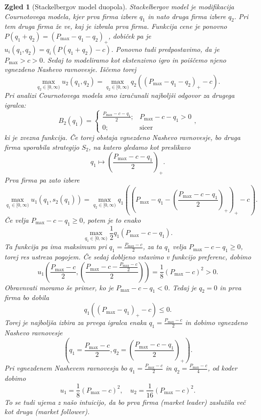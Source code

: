 \documentclass[10pt, a4paper]{article}
\newtheorem{zgled}[izr]{Zgled}
\begin{document}
\begin{zgled}[Stackelbergov model duopola]
  Stackelbergov model je modifikacija Cournotovega modela,
  kjer prva firma izbere $q_1$ in nato druga firma izbere $q_2$.
  Pri tem druga firma že ve, kaj je izbrala prva firma.
  Funkcija cene je ponovno $P(q_1 + q_2) = (P_{\max} -q_1 -q_2)_+$,
  dobiček pa je $u_i (q_1, q_2) = q_i(P(q_1 + q_2) - c)$.
  Ponovno tudi predpostavimo, da je $P_{\max} > c >0$.
  Sedaj to modeliramo kot ekstenzivno igro in poiščemo njeno vgnezdeno Nashevo ravnovesje.
  Iščemo torej 
  $$\max_{q_2 \in [0, \infty)} u_2 (q_1, q_2) = \max_{q_2 \in [0, \infty)} q_2 ((P_{\max} - q_1 - q_2)_+ - c).$$
  Pri analizi Cournotovega modela smo izračunali najboljši odgovor za drugega igralca:
  $$B_2 (q_1) = \begin{cases}
    \frac{P_{\max} - c - q_1}{2};& P_{\max} - c- q_1 > 0\\
    0;& \textrm{sicer}
  \end{cases},$$
  ki je zvezna funkcija. Če torej obstaja vgnezdeno Nashevo ravnovesje, bo druga firma uporabila strategijo $S_2$, 
  na katero gledamo kot preslikavo 
  $$q_1 \mapsto \left(\frac{P_{\max} - c - q_1}{2}\right)_+.$$
  Prva firma pa zato izbere 
  $$\max_{q_1 \in [0, \infty)} u_1 (q_1, s_2 (q_1)) = \max_{q_2 \in [0, \infty)} q_1 \left(\left(P_{\max} - q_1 - \left(\frac{P_{\max} - c- q_1}{2}\right)_+\right)_+ - c\right).$$
  Če velja $P_{\max} - c - q_1 \geq 0$, potem je to enako 
  $$\max_{q_1 \in [0, \infty)} \frac{1}{2} q_1 (P_{\max} - c - q_1).$$
  Ta funkcija pa ima maksimum pri $q_1 = \frac{P_{\max} - c}{2}$, za ta $q_1$ velja $P_{\max} - c - q_1 \geq 0$, torej 
  res ustreza pogojem. Če sedaj dobljeno vstavimo v funkcijo preferenc, dobimo 
  $$u_1\left(\frac{P_{\max} - c}{2}, \left(\frac{P_{\max} - c - \frac{P_{\max} - c}{2}}{2}\right)\right) = \frac{1}{8} (P_{\max} - c)^2 > 0.$$ 
  Obravnvati moramo še primer, ko je $P_{\max} - c - q_1 < 0$.
  Tedaj je $q_2 = 0$ in prva firma bo dobila 
  $$q_1 ((P_{\max} - q_1)_+ - c) \leq 0.$$
  Torej je najboljša izbira za prvega igralca enaka $q_1 = \frac{P_{\max} - c}{2}$
  in dobimo vgnezdeno Nashevo ravnovesje 
  $$\left(q_1 = \frac{P_{\max} - c}{2}, q_2 = \left(\frac{P_{\max} - c - q_1}{2}\right)_+\right).$$
  Pri vgnezdenem Nashevem ravnovesju bo $q_1 = \frac{P_{\max} - c}{2}$ in $q_2 = \frac{P_{\max} - c}{4}$, od koder dobimo 
  $$u_1 = \frac{1}{8} (P_{\max} - c)^2,\quad u_2 = \frac{1}{16} (P_{\max} - c)^2.$$
  To se tudi ujema z našo intuicijo, da bo prva firma (market leader)
  zaslužila več kot druga (market follower).
\end{zgled}
\end{document}
